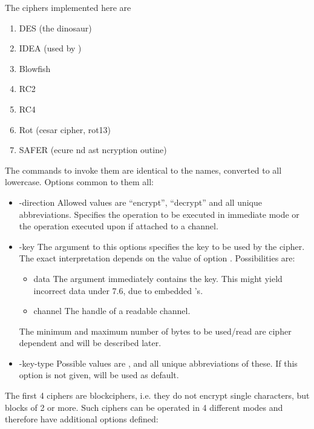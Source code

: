 \documentclass {report}
\begin{document}
The ciphers implemented here are

\begin {enumerate}
\item	DES 	(the dinosaur)
\item	IDEA	(used by \PGP)
\item	Blowfish
\item	RC2
\item	RC4
\item	Rot (cesar cipher, rot13)
\item	SAFER (ecure nd ast
		ncryption outine)
\end   {enumerate}

The commands to invoke them are identical to the names, converted to
all lowercase. Options common to them all:

\begin {itemize}
\item [-direction]	Allowed values are ``encrypt'', ``decrypt'' and all
			unique abbreviations. Specifies the operation
			to be executed in immediate mode or the
			operation executed upon  if
			attached to a channel.

\item [-key]		The argument to this options specifies the key
			to be used by the cipher. The exact
			interpretation depends on the value of option
			. Possibilities are:

	\begin {itemize}
	\item [data]	The argument immediately contains the
			key. This might yield incorrect data under
			\tcl{} 7.6, due to embedded \strterm{}'s.

	\item [channel]	The handle of a readable channel.
	\end   {itemize}

			The minimum and maximum number of bytes to be
			used/read are cipher dependent and will be
			described later.

\item [-key-type]	Possible values are ,
			 and all unique abbreviations
			of these. If this option is not given,
			 will be used as default.
\end   {itemize}

The first 4 ciphers are blockciphers, i.e. they do not encrypt single
characters, but blocks of 2 or more. Such ciphers can be operated in 4
different modes and therefore have additional options defined:
\end{document}

